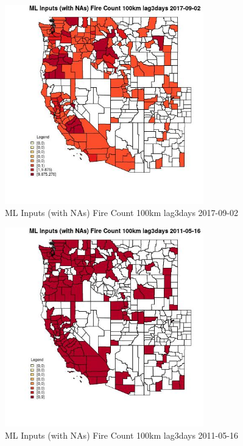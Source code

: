 \begin{figure} 
\centering  
\includegraphics[width=0.77\textwidth]{Code_Outputs/Report_ML_input_PM25_Step4_part_e_de_duplicated_aves_compiled_2019-05-21wNAs_CountyFire_Count_100km_lag3daysMean2017-09-02.jpg} 
\caption{\label{fig:Report_ML_input_PM25_Step4_part_e_de_duplicated_aves_compiled_2019-05-21wNAsCountyFire_Count_100km_lag3daysMean2017-09-02}ML Inputs (with NAs) Fire Count 100km lag3days 2017-09-02} 
\end{figure} 
 

\begin{figure} 
\centering  
\includegraphics[width=0.77\textwidth]{Code_Outputs/Report_ML_input_PM25_Step4_part_e_de_duplicated_aves_compiled_2019-05-21wNAs_CountyFire_Count_100km_lag3daysMean2011-05-16.jpg} 
\caption{\label{fig:Report_ML_input_PM25_Step4_part_e_de_duplicated_aves_compiled_2019-05-21wNAsCountyFire_Count_100km_lag3daysMean2011-05-16}ML Inputs (with NAs) Fire Count 100km lag3days 2011-05-16} 
\end{figure} 
 

